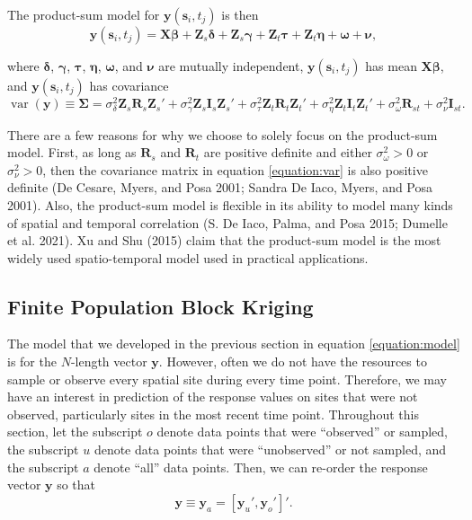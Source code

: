 \documentclass[smallextended]{svjour3}       %
\begin{document}
The product-sum model for \(\mathbf{y}(\mathbf{s}_{i}, t_j)\) is then
\mbox{} \begin{equation} \label{equation:model}
\mathbf{y}(\mathbf{s}_{i}, t_j) = \mathbf{X} \bm{\beta} + \mathbf{Z}_{s} \bm{\delta} + \mathbf{Z}_{s} \bm{\gamma} + \mathbf{Z}_t \bm{\tau} + \mathbf{Z}_t \bm{\eta} + \bm{\omega} + \bm{\nu},
\end{equation}

\noindent where \(\bm{\delta}\), \(\bm{\gamma}\), \(\bm{\tau}\),
\(\bm{\eta}\), \(\bm{\omega}\), and \(\bm{\nu}\) are mutually
independent, \(\mathbf{y}(\mathbf{s}_{i}, t_j)\) has mean
\(\mathbf{X} \bm{\beta}\), and \(\mathbf{y}(\mathbf{s}_{i}, t_j)\) has
covariance \mbox{} \begin{equation}
\label{equation:var}
\mathop{\mathrm{{var}}}(\mathbf{y}) \equiv \bm{\Sigma} = \sigma^2_{\delta} \mathbf{Z}_{s} \mathbf{R}_{s} \mathbf{Z}_{s}' + \sigma^2_{\gamma} \mathbf{Z}_{s} \mathbf{I}_{s} \mathbf{Z}_{s}' + \sigma^2_{\tau} \mathbf{Z}_t \mathbf{R}_t \mathbf{Z}_t'+ \sigma^2_{\eta} \mathbf{Z}_t \mathbf{I}_t \mathbf{Z}_t' + \sigma^2_{\omega} \mathbf{R}_{st} + \sigma^2_{\nu} \mathbf{I}_{st}.
\end{equation}

\noindent There are a few reasons for why we choose to solely focus on
the product-sum model. First, as long as \(\mathbf{R}_s\) and
\(\mathbf{R}_t\) are positive definite and either
\(\sigma^2_{\omega} > 0\) or \(\sigma^2_{\nu} > 0\), then the covariance
matrix in equation \ref{equation:var} is also positive definite (De
Cesare, Myers, and Posa 2001; Sandra De Iaco, Myers, and Posa 2001).
Also, the product-sum model is flexible in its ability to model many
kinds of spatial and temporal correlation (S. De Iaco, Palma, and Posa
2015; Dumelle et al. 2021). Xu and Shu (2015) claim that the product-sum
model is the most widely used spatio-temporal model used in practical
applications.

\hypertarget{subsection:fpbk}{%
\subsection{Finite Population Block Kriging}\label{subsection:fpbk}}

The model that we developed in the previous section in equation
\ref{equation:model} is for the \(N\)-length vector \(\mathbf{y}\).
However, often we do not have the resources to sample or observe every
spatial site during every time point. Therefore, we may have an interest
in prediction of the response values on sites that were not observed,
particularly sites in the most recent time point. Throughout this
section, let the subscript \(o\) denote data points that were
``observed'' or sampled, the subscript \(u\) denote data points that
were ``unobserved'' or not sampled, and the subscript \(a\) denote
``all'' data points. Then, we can re-order the response vector
\(\mathbf{y}\) so that \mbox{} \begin{equation} \label{equation:ordered}
\mathbf{y} \equiv \mathbf{y}_a = [\mathbf{y}_u', \mathbf{y}_o']'.
\end{equation}
\end{document}
